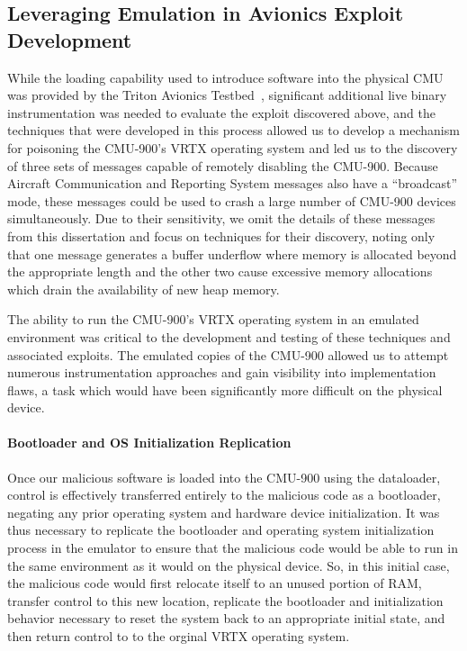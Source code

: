 \subsection{Leveraging Emulation in Avionics Exploit Development}
\label{sec:jetset-attack}
\label{sec:cmu-attack}

While the loading capability used to introduce software into the physical CMU was provided by the Triton Avionics Testbed~\cite{crow2019triton}, significant additional live binary instrumentation was needed to evaluate the exploit discovered above, and the techniques that were developed in this process allowed us to develop a mechanism for poisoning the CMU-900's VRTX operating system and led us to the discovery of three sets of messages capable of remotely disabling the CMU-900.
Because Aircraft Communication and Reporting System messages also have a ``broadcast'' mode, these messages could be used to crash a large number of CMU-900 devices simultaneously.
Due to their sensitivity, we omit the details of these messages from this dissertation and focus on techniques for their discovery, noting only that one message generates a buffer underflow where memory is allocated beyond the appropriate length and the other two cause excessive memory allocations which drain the availability of new heap memory.

The ability to run the CMU-900's VRTX operating system in an emulated environment was critical to the development and testing of these techniques and associated exploits.
The emulated copies of the CMU-900 allowed us to attempt numerous instrumentation approaches and gain visibility into implementation flaws, a task which would have been significantly more difficult on the physical device.

\paragraph{Bootloader and OS Initialization Replication}
Once our malicious software is loaded into the CMU-900 using the dataloader, control is effectively transferred entirely to the malicious code as a bootloader, negating any prior operating system and hardware device initialization.
It was thus necessary to replicate the bootloader and operating system initialization process in the emulator to ensure that the malicious code would be able to run in the same environment as it would on the physical device.
So, in this initial case, the malicious code would first relocate itself to an unused portion of RAM, transfer control to this new location, replicate the bootloader and initialization behavior necessary to reset the system back to an appropriate initial state, and then return control to to the orginal VRTX operating system.

